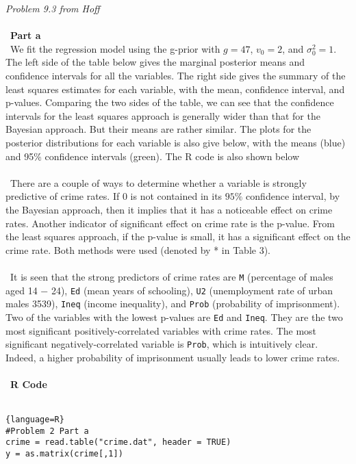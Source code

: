 \documentclass[12pt]{article}
\newenvironment{problem}[2][Problem]{\begin{trivlist}
\item[\hskip \labelsep {\bfseries #1}\hskip \labelsep {\bfseries #2.}]}{\end{trivlist}}
\begin{document}
\begin{problem}{2} \textit{Problem 9.3 from Hoff}
\\\
\\\
\textbf{Part a}
\\\
We fit the regression model using the g-prior with $g=47$, $v_{0}=2$, and $\sigma_{0}^{2}=1$. 
The left side of the table below gives the marginal posterior means and confidence intervals for all the variables. The right side gives the summary of the least squares estimates for each variable, with the mean, confidence interval, and p-values. Comparing the two sides of the table, we can see that the confidence intervals for the least squares approach is generally wider than that for the Bayesian approach. But their means are rather similar. The plots for the posterior distributions for each variable is also give below, with the means (blue) and 95\% confidence intervals (green). The R code is also shown below\\
\\\
There are a couple of ways to determine whether a variable is strongly predictive of crime rates. If 0 is not contained in its $95\%$ confidence interval, by the Bayesian approach, then it implies that it has a noticeable effect on crime rates. Another indicator of significant effect on crime rate is the p-value. From the least squares approach, if the p-value is small, it has a significant effect on the crime rate. Both methods were used (denoted by * in Table 3). \\
\\\
It is seen that the strong predictors of crime rates are \texttt{M} (percentage of males aged 14 − 24), \texttt{Ed} (mean years of schooling), \texttt{U2} (unemployment rate of urban males 3539), \texttt{Ineq} (income inequality), and \texttt{Prob} (probability of imprisonment). Two of the variables with the lowest p-values are \texttt{Ed} and \texttt{Ineq}. They are the two most significant positively-correlated variables with crime rates. The most significant negatively-correlated variable is \texttt{Prob}, which is intuitively clear. Indeed, a higher probability of imprisonment usually leads to lower crime rates.\\
\\\
\textbf{R Code} 
\\\
\begin{lstlisting}{language=R}
#Problem 2 Part a
crime = read.table("crime.dat", header = TRUE)
y = as.matrix(crime[,1])

\end{lstlisting}
\end{problem}
\end{document}

